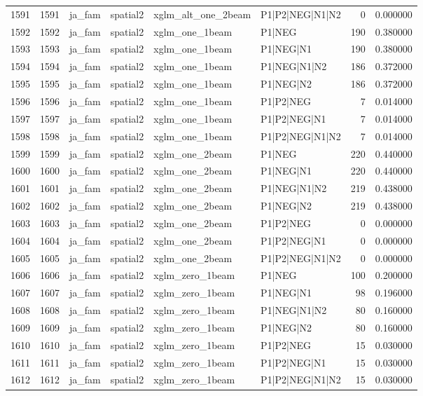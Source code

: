 \begin{tabular}{lrllllrr}
1591 & 1591 & ja_fam & spatial2 & xglm_alt_one_2beam & P1|P2|NEG|N1|N2 & 0 & 0.000000 \\
1592 & 1592 & ja_fam & spatial2 & xglm_one_1beam & P1|NEG & 190 & 0.380000 \\
1593 & 1593 & ja_fam & spatial2 & xglm_one_1beam & P1|NEG|N1 & 190 & 0.380000 \\
1594 & 1594 & ja_fam & spatial2 & xglm_one_1beam & P1|NEG|N1|N2 & 186 & 0.372000 \\
1595 & 1595 & ja_fam & spatial2 & xglm_one_1beam & P1|NEG|N2 & 186 & 0.372000 \\
1596 & 1596 & ja_fam & spatial2 & xglm_one_1beam & P1|P2|NEG & 7 & 0.014000 \\
1597 & 1597 & ja_fam & spatial2 & xglm_one_1beam & P1|P2|NEG|N1 & 7 & 0.014000 \\
1598 & 1598 & ja_fam & spatial2 & xglm_one_1beam & P1|P2|NEG|N1|N2 & 7 & 0.014000 \\
1599 & 1599 & ja_fam & spatial2 & xglm_one_2beam & P1|NEG & 220 & 0.440000 \\
1600 & 1600 & ja_fam & spatial2 & xglm_one_2beam & P1|NEG|N1 & 220 & 0.440000 \\
1601 & 1601 & ja_fam & spatial2 & xglm_one_2beam & P1|NEG|N1|N2 & 219 & 0.438000 \\
1602 & 1602 & ja_fam & spatial2 & xglm_one_2beam & P1|NEG|N2 & 219 & 0.438000 \\
1603 & 1603 & ja_fam & spatial2 & xglm_one_2beam & P1|P2|NEG & 0 & 0.000000 \\
1604 & 1604 & ja_fam & spatial2 & xglm_one_2beam & P1|P2|NEG|N1 & 0 & 0.000000 \\
1605 & 1605 & ja_fam & spatial2 & xglm_one_2beam & P1|P2|NEG|N1|N2 & 0 & 0.000000 \\
1606 & 1606 & ja_fam & spatial2 & xglm_zero_1beam & P1|NEG & 100 & 0.200000 \\
1607 & 1607 & ja_fam & spatial2 & xglm_zero_1beam & P1|NEG|N1 & 98 & 0.196000 \\
1608 & 1608 & ja_fam & spatial2 & xglm_zero_1beam & P1|NEG|N1|N2 & 80 & 0.160000 \\
1609 & 1609 & ja_fam & spatial2 & xglm_zero_1beam & P1|NEG|N2 & 80 & 0.160000 \\
1610 & 1610 & ja_fam & spatial2 & xglm_zero_1beam & P1|P2|NEG & 15 & 0.030000 \\
1611 & 1611 & ja_fam & spatial2 & xglm_zero_1beam & P1|P2|NEG|N1 & 15 & 0.030000 \\
1612 & 1612 & ja_fam & spatial2 & xglm_zero_1beam & P1|P2|NEG|N1|N2 & 15 & 0.030000 \\

\end{tabular}
